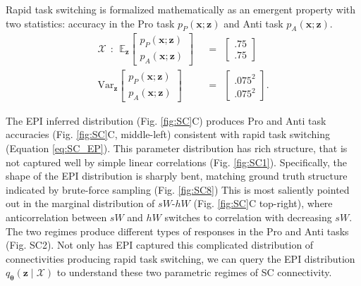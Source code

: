 \documentclass[11pt]{article}
\begin{document}
Rapid task switching is formalized mathematically as an emergent property with two statistics: accuracy in the Pro task $p_P(\mathbf{x}; \mathbf{z})$ and Anti task $p_A(\mathbf{x}; \mathbf{z})$.
\begin{equation}\label{eq:SC_EP}
\begin{split}
\mathcal{X} ~~:~~ \mathbb{E}_{\mathbf{z}}\begin{bmatrix} p_P(\mathbf{x}; \mathbf{z}) \\ p_A(\mathbf{x}; \mathbf{z}) \end{bmatrix}  &~~=~~  \begin{bmatrix} .75 \\ .75 \end{bmatrix}  \\ 
 \text{Var}_{\mathbf{z}}\begin{bmatrix} p_P(\mathbf{x}; \mathbf{z}) \\ p_A(\mathbf{x}; \mathbf{z}) \end{bmatrix}  &~~=~~  \begin{bmatrix} .075^2 \\ .075^2  \end{bmatrix}.
\end{split}
\end{equation}

The EPI inferred distribution  (Fig. \ref{fig:SC}C) produces Pro and Anti task accuracies (Fig. \ref{fig:SC}C, middle-left) consistent with rapid task switching (Equation \ref{eq:SC_EP}).
This parameter distribution has rich structure, that is not captured well by simple linear correlations (Fig. \ref{fig:SC1}).
Specifically, the shape of the EPI distribution is sharply bent, matching ground truth structure indicated by brute-force sampling (Fig. \ref{fig:SC8})
This is most saliently pointed out in the marginal distribution of  $sW$-$hW$ (Fig. \ref{fig:SC}C top-right), where anticorrelation between $sW$ and $hW$ switches to correlation with decreasing $sW$.
The two regimes produce different types of responses in the Pro and Anti tasks (Fig. SC2).
Not only has EPI captured this complicated distribution of connectivities producing rapid task switching, we can query the EPI distribution $q_{\bm{\theta}}(\mathbf{z} \mid \mathcal{X})$ to understand these two parametric regimes of SC connectivity.
\end{document}
